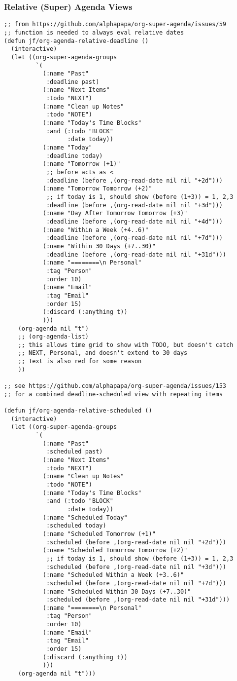 \documentclass[8pt]{article}
\begin{document}
\subsubsection{Relative (Super) Agenda Views}
\label{sec:orgd48f7f2}
\begin{verbatim}
;; from https://github.com/alphapapa/org-super-agenda/issues/59
;; function is needed to always eval relative dates
(defun jf/org-agenda-relative-deadline ()
  (interactive)
  (let ((org-super-agenda-groups
         `(
           (:name "Past"
            :deadline past)
           (:name "Next Items"
            :todo "NEXT")
           (:name "Clean up Notes"
            :todo "NOTE")
           (:name "Today's Time Blocks"
            :and (:todo "BLOCK"
                  :date today))
           (:name "Today"
            :deadline today)
           (:name "Tomorrow (+1)"
            ;; before acts as <
            :deadline (before ,(org-read-date nil nil "+2d")))
           (:name "Tomorrow Tomorrow (+2)"
            ;; if today is 1, should show (before (1+3)) = 1, 2,3
            :deadline (before ,(org-read-date nil nil "+3d")))
           (:name "Day After Tomorrow Tomorrow (+3)"
            :deadline (before ,(org-read-date nil nil "+4d")))
           (:name "Within a Week (+4..6)"
            :deadline (before ,(org-read-date nil nil "+7d")))
           (:name "Within 30 Days (+7..30)"
            :deadline (before ,(org-read-date nil nil "+31d")))
           (:name "========\n Personal"
            :tag "Person"
            :order 10)
           (:name "Email"
            :tag "Email"
            :order 15)
           (:discard (:anything t))
           )))
    (org-agenda nil "t")
    ;; (org-agenda-list)
    ;; this allows time grid to show with TODO, but doesn't catch
    ;; NEXT, Personal, and doesn't extend to 30 days
    ;; Text is also red for some reason
    ))

;; see https://github.com/alphapapa/org-super-agenda/issues/153
;; for a combined deadline-scheduled view with repeating items

(defun jf/org-agenda-relative-scheduled ()
  (interactive)
  (let ((org-super-agenda-groups
         `(
           (:name "Past"
            :scheduled past)
           (:name "Next Items"
            :todo "NEXT")
           (:name "Clean up Notes"
            :todo "NOTE")
           (:name "Today's Time Blocks"
            :and (:todo "BLOCK"
                  :date today))
           (:name "Scheduled Today"
            :scheduled today)
           (:name "Scheduled Tomorrow (+1)"
            :scheduled (before ,(org-read-date nil nil "+2d")))
           (:name "Scheduled Tomorrow Tomorrow (+2)"
            ;; if today is 1, should show (before (1+3)) = 1, 2,3
            :scheduled (before ,(org-read-date nil nil "+3d")))
           (:name "Scheduled Within a Week (+3..6)"
            :scheduled (before ,(org-read-date nil nil "+7d")))
           (:name "Scheduled Within 30 Days (+7..30)"
            :scheduled (before ,(org-read-date nil nil "+31d")))
           (:name "========\n Personal"
            :tag "Person"
            :order 10)
           (:name "Email"
            :tag "Email"
            :order 15)
           (:discard (:anything t))
           )))
    (org-agenda nil "t")))


\end{verbatim}
\end{document}
